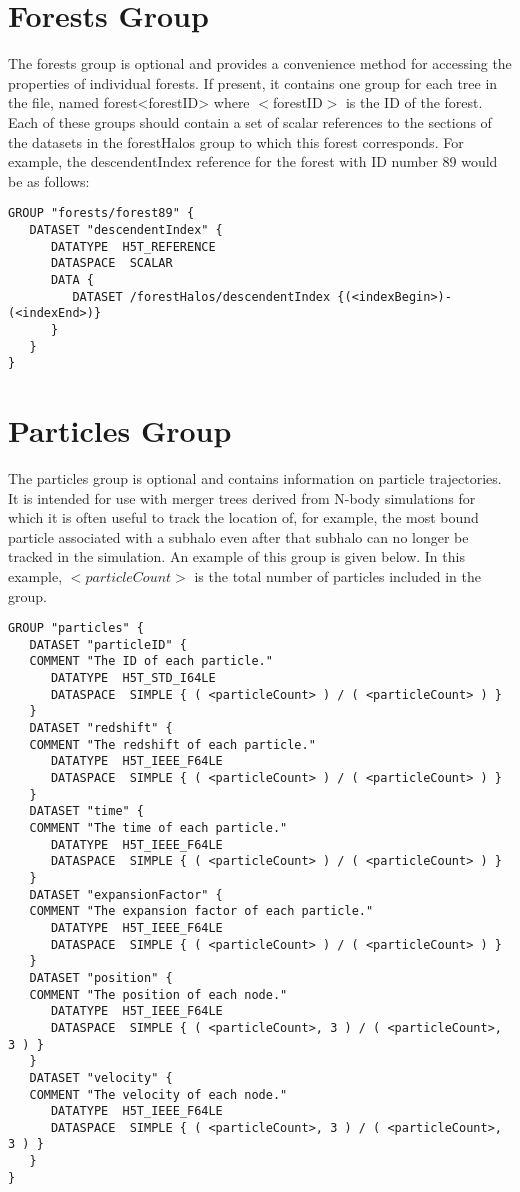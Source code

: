 \section{Forests Group}

The {\normalfont \ttfamily forests} group is optional and provides a convenience method for accessing the properties of individual forests. If present, it contains one group for each tree in the file, named {\normalfont \ttfamily forest<forestID>} where {\normalfont \ttfamily $<$forestID$>$} is the ID of the forest. Each of these groups should contain a set of scalar references to the sections of the datasets in the {\normalfont \ttfamily forestHalos} group to which this forest corresponds. For example, the {\normalfont \ttfamily descendentIndex} reference for the forest with ID number 89 would be as follows:

\begin{verbatim}
GROUP "forests/forest89" {
   DATASET "descendentIndex" {
      DATATYPE  H5T_REFERENCE
      DATASPACE  SCALAR
      DATA {
         DATASET /forestHalos/descendentIndex {(<indexBegin>)-(<indexEnd>)}
      }
   }
}
\end{verbatim}

\section{Particles Group}

The {\normalfont \ttfamily particles} group is optional and contains information on particle trajectories. It is intended for use with merger trees derived from N-body simulations for which it is often useful to track the location of, for example, the most bound particle associated with a subhalo even after that subhalo can no longer be tracked in the simulation. An example of this group is given below. In this example, {\normalfont \ttfamily $<particleCount>$} is the total number of particles included in the group.

\begin{verbatim}
GROUP "particles" {
   DATASET "particleID" {
   COMMENT "The ID of each particle."
      DATATYPE  H5T_STD_I64LE
      DATASPACE  SIMPLE { ( <particleCount> ) / ( <particleCount> ) }
   }
   DATASET "redshift" {
   COMMENT "The redshift of each particle."
      DATATYPE  H5T_IEEE_F64LE
      DATASPACE  SIMPLE { ( <particleCount> ) / ( <particleCount> ) }
   }
   DATASET "time" {
   COMMENT "The time of each particle."
      DATATYPE  H5T_IEEE_F64LE
      DATASPACE  SIMPLE { ( <particleCount> ) / ( <particleCount> ) }
   }
   DATASET "expansionFactor" {
   COMMENT "The expansion factor of each particle."
      DATATYPE  H5T_IEEE_F64LE
      DATASPACE  SIMPLE { ( <particleCount> ) / ( <particleCount> ) }
   }
   DATASET "position" {
   COMMENT "The position of each node."
      DATATYPE  H5T_IEEE_F64LE
      DATASPACE  SIMPLE { ( <particleCount>, 3 ) / ( <particleCount>, 3 ) }
   }
   DATASET "velocity" {
   COMMENT "The velocity of each node."
      DATATYPE  H5T_IEEE_F64LE
      DATASPACE  SIMPLE { ( <particleCount>, 3 ) / ( <particleCount>, 3 ) }
   }
}
\end{verbatim}


